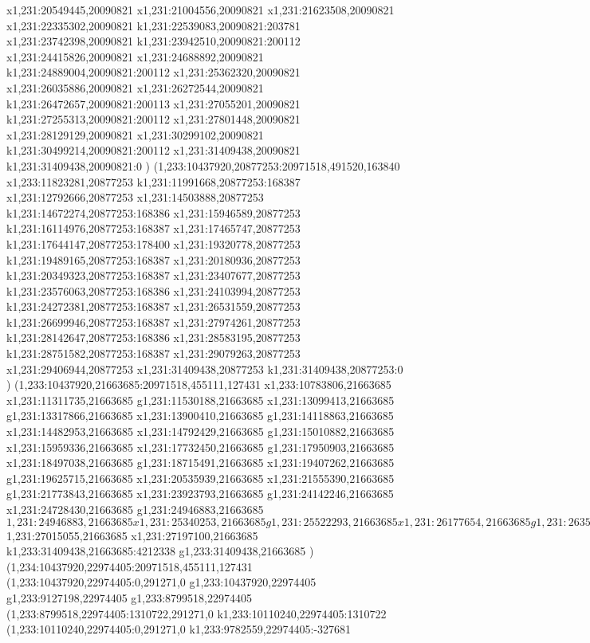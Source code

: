 {x1,231:20549445,20090821
x1,231:21004556,20090821
x1,231:21623508,20090821
x1,231:22335302,20090821
k1,231:22539083,20090821:203781
x1,231:23742398,20090821
k1,231:23942510,20090821:200112
x1,231:24415826,20090821
x1,231:24688892,20090821
k1,231:24889004,20090821:200112
x1,231:25362320,20090821
x1,231:26035886,20090821
x1,231:26272544,20090821
k1,231:26472657,20090821:200113
x1,231:27055201,20090821
k1,231:27255313,20090821:200112
x1,231:27801448,20090821
x1,231:28129129,20090821
x1,231:30299102,20090821
k1,231:30499214,20090821:200112
x1,231:31409438,20090821
k1,231:31409438,20090821:0
)
(1,233:10437920,20877253:20971518,491520,163840
x1,233:11823281,20877253
k1,231:11991668,20877253:168387
x1,231:12792666,20877253
x1,231:14503888,20877253
k1,231:14672274,20877253:168386
x1,231:15946589,20877253
k1,231:16114976,20877253:168387
x1,231:17465747,20877253
k1,231:17644147,20877253:178400
x1,231:19320778,20877253
k1,231:19489165,20877253:168387
x1,231:20180936,20877253
k1,231:20349323,20877253:168387
x1,231:23407677,20877253
k1,231:23576063,20877253:168386
x1,231:24103994,20877253
k1,231:24272381,20877253:168387
x1,231:26531559,20877253
k1,231:26699946,20877253:168387
x1,231:27974261,20877253
k1,231:28142647,20877253:168386
x1,231:28583195,20877253
k1,231:28751582,20877253:168387
x1,231:29079263,20877253
x1,231:29406944,20877253
x1,231:31409438,20877253
k1,231:31409438,20877253:0
)
(1,233:10437920,21663685:20971518,455111,127431
x1,233:10783806,21663685
x1,231:11311735,21663685
g1,231:11530188,21663685
x1,231:13099413,21663685
g1,231:13317866,21663685
x1,231:13900410,21663685
g1,231:14118863,21663685
x1,231:14482953,21663685
x1,231:14792429,21663685
g1,231:15010882,21663685
x1,231:15959336,21663685
x1,231:17732450,21663685
g1,231:17950903,21663685
x1,231:18497038,21663685
g1,231:18715491,21663685
x1,231:19407262,21663685
g1,231:19625715,21663685
x1,231:20535939,21663685
x1,231:21555390,21663685
g1,231:21773843,21663685
x1,231:23923793,21663685
g1,231:24142246,21663685
x1,231:24728430,21663685
g1,231:24946883,21663685
$1,231:24946883,21663685
x1,231:25340253,21663685
g1,231:25522293,21663685
x1,231:26177654,21663685
g1,231:26359694,21663685
x1,231:27015055,21663685
$1,231:27015055,21663685
x1,231:27197100,21663685
k1,233:31409438,21663685:4212338
g1,233:31409438,21663685
)
(1,234:10437920,22974405:20971518,455111,127431
(1,233:10437920,22974405:0,291271,0
g1,233:10437920,22974405
g1,233:9127198,22974405
g1,233:8799518,22974405
(1,233:8799518,22974405:1310722,291271,0
k1,233:10110240,22974405:1310722
(1,233:10110240,22974405:0,291271,0
k1,233:9782559,22974405:-327681
}
